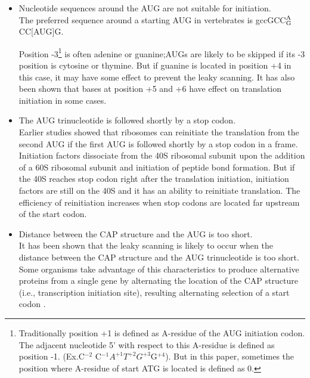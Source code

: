 \begin{itemize}
\item Nucleotide sequences around the AUG are not suitable for
initiation. \\
The preferred sequence around a starting AUG in
vertebrates is gccGCC$^{\rm A}_{\rm G}$CC[AUG]G\cite{label3}.

Position -3\footnote{Traditionally 
position +1 is defined as A-residue of the AUG initiation codon. The adjacent
nucleotide 5' with respect to this A-residue is defined as position -1.
 (Ex.C$^{-2}$
C$^{-1}$$A^{+1}T^{+2}G^{+3}$G$^{+4}$). But in this paper,
sometimes the position where A-residue of start ATG is located is defined as 0.}
is often adenine or guanine\cite{label4};AUGs are likely to be skipped
if its -3 position is cytosine or thymine. But if guanine is
located in position +4 in this case, it may have some effect to
prevent the leaky scanning. 
It has also been shown that bases at position +5 and +6 have effect on
translation initiation in some cases\cite{label7219}.

\item The AUG trinucleotide is followed shortly by a stop codon.\\
Earlier studies showed that ribosomes can reinitiate the translation
from the second AUG if the first AUG is followed shortly by a stop
codon in a frame. Initiation factors dissociate from the 40S ribosomal
subunit upon the addition of a 60S ribosomal subunit and initiation of
peptide bond formation. But if the 40S reaches stop codon right after
the translation initiation, initiation factors are still on the 40S
and it has an ability to reinitiate translation\cite{label4}. The
efficiency of reinitiation increases when stop codons are located far
upstream of the start codon\cite{label18}.

\item Distance between the CAP structure and the AUG is too
short.\\  It has been shown that the leaky scanning is likely to occur
when the distance between the CAP structure and the AUG trinucleotide is too
short\cite{label19}.  
Some organisms take advantage of this characteristics to produce
alternative proteins from a single gene by alternating
the location of the CAP structure (i.e., transcription initiation site),
resulting alternating selection of a start codon
\cite{label5}.


\end{itemize}
